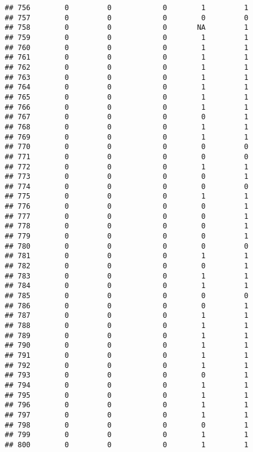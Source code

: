 \documentclass[
]{article}
\begin{document}
\begin{verbatim}
## 756        0         0            0        1         1
## 757        0         0            0        0         0
## 758        0         0            0       NA         1
## 759        0         0            0        1         1
## 760        0         0            0        1         1
## 761        0         0            0        1         1
## 762        0         0            0        1         1
## 763        0         0            0        1         1
## 764        0         0            0        1         1
## 765        0         0            0        1         1
## 766        0         0            0        1         1
## 767        0         0            0        0         1
## 768        0         0            0        1         1
## 769        0         0            0        1         1
## 770        0         0            0        0         0
## 771        0         0            0        0         0
## 772        0         0            0        1         1
## 773        0         0            0        0         1
## 774        0         0            0        0         0
## 775        0         0            0        1         1
## 776        0         0            0        0         1
## 777        0         0            0        0         1
## 778        0         0            0        0         1
## 779        0         0            0        0         1
## 780        0         0            0        0         0
## 781        0         0            0        1         1
## 782        0         0            0        0         1
## 783        0         0            0        1         1
## 784        0         0            0        1         1
## 785        0         0            0        0         0
## 786        0         0            0        0         1
## 787        0         0            0        1         1
## 788        0         0            0        1         1
## 789        0         0            0        1         1
## 790        0         0            0        1         1
## 791        0         0            0        1         1
## 792        0         0            0        1         1
## 793        0         0            0        0         1
## 794        0         0            0        1         1
## 795        0         0            0        1         1
## 796        0         0            0        1         1
## 797        0         0            0        1         1
## 798        0         0            0        0         1
## 799        0         0            0        1         1
## 800        0         0            0        1         1

\end{verbatim}
\end{document}

